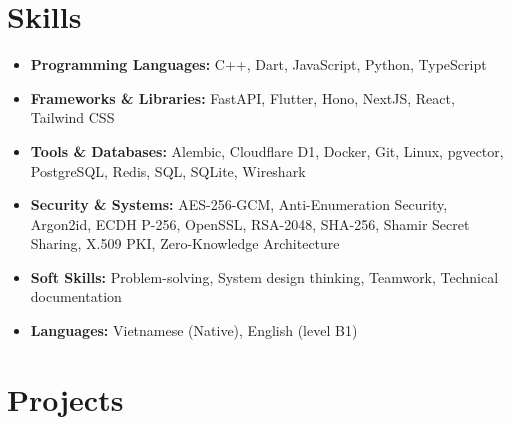 \documentclass[10pt,a4paper]{article}
\begin{document}
\section*{Skills}
\begin{itemize}[leftmargin=0.15in, label={}, itemsep=0pt]
    \item \textbf{Programming Languages:} C++, Dart, JavaScript, Python, TypeScript
    \item \textbf{Frameworks \& Libraries:} FastAPI, Flutter, Hono, NextJS, React, Tailwind CSS
    \item \textbf{Tools \& Databases:} Alembic, Cloudflare D1, Docker, Git, Linux, pgvector, PostgreSQL, Redis, SQL, SQLite, Wireshark
    \item \textbf{Security \& Systems:} AES-256-GCM, Anti-Enumeration Security, Argon2id, ECDH P-256, OpenSSL, RSA-2048, SHA-256, Shamir Secret Sharing, X.509 PKI, Zero-Knowledge Architecture
    \item \textbf{Soft Skills:} Problem-solving, System design thinking, Teamwork, Technical documentation
    \item \textbf{Languages:} Vietnamese (Native), English (level B1)
\end{itemize}

\section*{Projects}
\end{document}
